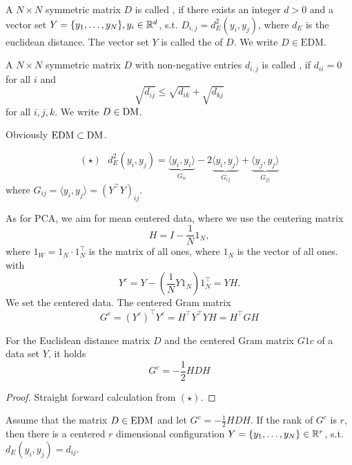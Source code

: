 \begin{definition}\label{def:2.4}
    A $N\times N$ symmetric matrix $D$ is called , if there exists 
    an integer $d>0$ and a vector set $Y=\{y_1,\dots,y_N\},y_i\in\mathbb{R}^d$, s.t. $D_{i,j}=d_E^2(y_i,y_j)$,
    where $d_E$ is the euclidean distance. The vector set $Y$ is called the  of $D$. We write $D\in\text{EDM}$.
\end{definition}

\begin{definition}\label{def:2.5}
    A $N\times N$ symmetric matrix $D$ with non-negative entries $d_{i,j}$ is called , if $d_{ii}=0$ for all $i$ and 
    \[\sqrt{d_{ij}}\leq \sqrt{d_{ik}}+\sqrt{d_{kj}}\]
    for all $i,j,k$. We write $D\in \text{DM}$. 
\end{definition}

Obviously $\text{EDM}\subset\text{DM}$.

\[(\star)\text{ } d_E^2(y_i,y_j)=\underbrace{\langle y_i,y_i\rangle}_{G_{ii}}-2\underbrace{\langle y_i,y_j\rangle}_{G_{ij}}+\underbrace{\langle y_j,y_j\rangle}_{G_{jj}}\]
where $G_{ij}=\langle y_i,y_j\rangle = (Y^\intercal Y)_{ij}$.

As for PCA, we aim for mean centered data, where we use the centering matrix
\[H=I-\frac{1}{N}1_N,\]
where $1_W=1_N\cdot 1_N^\intercal$ is the matrix of all ones, where $1_N$ is the vector of all ones. %
with \[Y^c=Y-(\frac{1}{N}Y1_N)1_N^{\intercal}=YH.\]
We set the centered data. The centered Gram matrix
\[G^c=(Y^c)^\intercal Y^c=H^\intercal Y^\intercal Y H =H^\intercal G H\]

\begin{theorem}\label{thm:2.6}
    For the Euclidean distance matrix $D$ and the centered Gram matrix $G1 c$ of a data set $Y$, it holds 
    \[G^c=-\frac{1}{2}H D H\]
\end{theorem}

\begin{proof}
    Straight forward calculation from $(\star)$.
\end{proof}


\begin{lemma}\label{lem:2.7}
    Assume that the matrix $D\in\text{EDM}$ and let $G^c=-\frac{1}{2} HDH$. If the rank of $G^c$ is $r$, then 
    there is a centered $r$ dimensional configuration $Y=\{y_1,\dots,y_N\}\in\mathbb{R}^r$, s.t. $d_E(y_i,y_j)=d_{ij}$.
\end{lemma}

